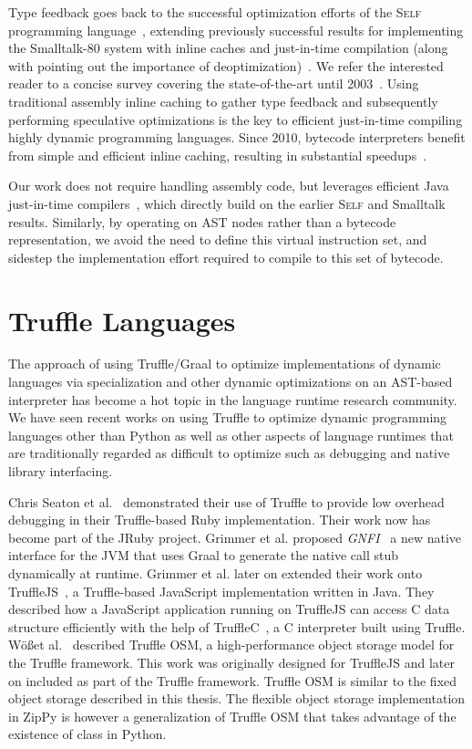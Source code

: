 Type feedback goes back to the successful optimization efforts of the \textsc{Self} programming language~\cite{holzle.ungar+94,holzle+94}, extending previously successful results for implementing the Smalltalk-80 system with inline caches and just-in-time compilation (along with pointing out the importance of deoptimization)~\cite{Deutsch1984}.
We refer the interested reader to a concise survey covering the state-of-the-art until 2003~\cite{aycock+03}.
Using traditional assembly inline caching to gather type feedback and subsequently performing speculative optimizations is the key to efficient just-in-time compiling highly dynamic programming languages.
Since 2010, bytecode interpreters benefit from simple and efficient inline caching, resulting in substantial speedups~\cite{Brunthaler2010inca,williams.etal+10}.

Our work does not require handling assembly code, but leverages efficient Java just-in-time compilers~\cite{kotzmann.etal+08,paleczny.etal+01}, which directly build on the earlier
\textsc{Self} and Smalltalk results. Similarly, by operating on AST nodes rather than a bytecode representation, we avoid the need to define this virtual instruction set, and sidestep the implementation effort required to compile to this set of bytecode.

\section{Truffle Languages}

The approach of using Truffle/Graal to optimize implementations of dynamic languages via specialization and other dynamic optimizations on an AST-based interpreter has become a hot topic in the language runtime research community.
We have seen recent works on using Truffle to optimize dynamic programming languages other than Python as well as other aspects of language runtimes that are traditionally regarded as difficult to optimize such as debugging and native library interfacing.

Chris Seaton et al.~\cite{seaton2014debugging} demonstrated their use of Truffle to provide low overhead debugging in their Truffle-based Ruby implementation.
Their work now has become part of the JRuby project.
Grimmer et al. proposed \emph{GNFI}~\cite{Grimmer+2013} a new native interface for the JVM that uses Graal to generate the native call stub dynamically at runtime.
Grimmer et al. later on extended their work onto TruffleJS~\cite{Grimmer+2014}, a Truffle-based JavaScript implementation written in Java.
They described how a JavaScript application running on TruffleJS can access C data structure efficiently with the help of TruffleC~\cite{Grimmer+2014TruffleC}, a C interpreter built using Truffle.
W\"{o}\ss et al.~\cite{WoB+2014} described Truffle OSM, a high-performance object storage model for the Truffle framework.
This work was originally designed for TruffleJS and later on included as part of the Truffle framework.
Truffle OSM is similar to the fixed object storage described in this thesis.
The flexible object storage implementation in ZipPy is however a generalization of Truffle OSM that takes advantage of the existence of class in Python.

